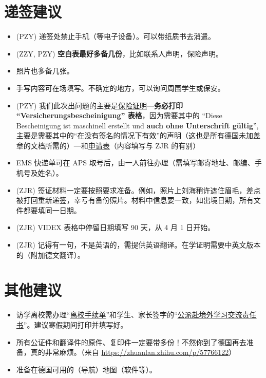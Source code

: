 \documentclass[oneside,final]{book}
\begin{document}
\section{递签建议}
\begin{itemize}
\item (PZY) 递签处禁止手机（等电子设备）。可以带纸质书去消遣。
\item (ZZY, PZY) \textbf{\color{blue}空白表最好多备几份}，比如联系人声明，保险声明。
\item\label{print-fee} 照片也多备几张。
\item 手写内容可在场填写。不确定的地方，可以询问周围学生或保安。
\item\label{ensurance-Versicherungsbescheinigung} (PZY) 我们此次出问题的主要是\underline{保险证明}---\textbf{\color{red}务必打印 ``Versicherungsbescheinigung'' 表格}，因为需要其中的 ``Diese Bescheinigung ist maschinell erstellt und \textbf{\color{red}auch ohne Unterschrift gültig}'', 主要是需要其中的“在没有签名的情况下有效”的声明（这也是所有德国未加盖章的文档所需的）---和\underline{申请表}（内容填写与 ZJR 的有别）%
\item EMS 快递单可在 APS 取号后，由一人前往办理（需填写邮寄地址、邮编、手机号及姓名）。
\item (ZJR) 签证材料一定要按照要求准备。例如，照片上刘海稍许遮住眉毛，差点被打回重新递签，幸亏有备份照片。材料中信息要一致，如出境日期，所有文件都要填同一日期。
\item (ZJR) VIDEX 表格中停留日期填写 90 天，从 4 月 1 日开始。
\item (ZJR) 记得有一句，不是英语的，需提供英语翻译。在学证明需要中英文版本的（附加德文翻译）。
\end{itemize}
%

\section{其他建议}
\begin{itemize}
  \item 访学离校需办理“\href{http://bkjy.ucas.ac.cn/index.php/fxjl/download/3401-2017-06-13-03-47-14?task=down&fid=818}{离校手续单}”和学生、家长签字的“\href{http://bkjy.ucas.ac.cn/index.php/fxjl/download/3400-2017-06-13-03-46-26?task=down&fid=701}{公派赴境外学习交流责任书}”。建议寒假期间打印并填写好。
  \item 所有公证件和翻译件的原件、复印件一定要带多份！不然你到了德国再去准备，真的非常麻烦。（来自 \url{https://zhuanlan.zhihu.com/p/57766122}）
  \item 准备在德国可用的（导航）地图（软件等）。
\end{itemize}
\end{document}
